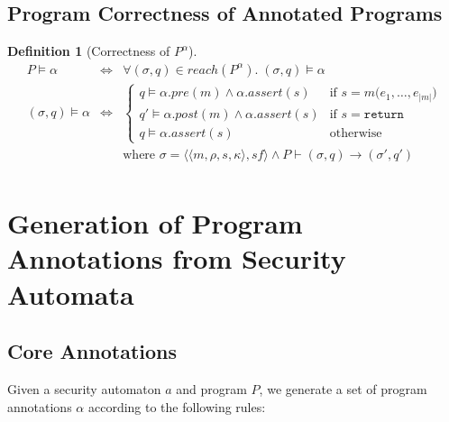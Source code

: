 \documentclass[10pt,notitlepage,twoside]{article}
\newcommand{\eframe}[4]{\langle #1, #2, #3, #4 \rangle}
\newcommand{\state}[2]{\langle #1, #2 \rangle}
\newcommand{\cf}{\mathit{sf}}
\newcommand{\pre}{\mathit{pre}}
\newcommand{\post}{\mathit{post}}
\newtheorem{definition}{Definition}
\begin{document}

\subsection{Program Correctness of Annotated Programs}


\begin{definition}[Correctness of $P^\alpha$]
\begin{displaymath}
\begin{array}{rcl}
P \models \alpha & \Leftrightarrow & \forall (\sigma,q) \in \mathit{reach}(P^\alpha).\; (\sigma,q) \models \alpha \\
(\sigma,q) \models \alpha & \Leftrightarrow &
\left \{ \begin{array}{ll}
q \models \alpha.\pre(m) \wedge \alpha.\mathit{assert}(s)  & \mbox{if } s = m\texttt{(}e_1,\ldots,e_{|m|}\texttt{)} \\
q' \models \alpha.\post(m) \wedge \alpha.\mathit{assert}(s) & \mbox{if } s = \texttt{return} \\
q \models \alpha.\mathit{assert}(s) & \mbox{otherwise}
\end{array} \right .  \\
& & \mbox{where } \sigma = \state{\eframe{m}{\rho}{s}{\kappa}}{\cf} \wedge
 P \vdash   (\sigma,q) \rightarrow  (\sigma',q') \\
\end{array}
\end{displaymath}
\end{definition}


\section{Generation of Program Annotations from Security Automata}

\subsection{Core Annotations}

Given a security automaton $a$ and program $P$, we generate a set of program annotations $\alpha$ according to the following rules: 
\end{document}
